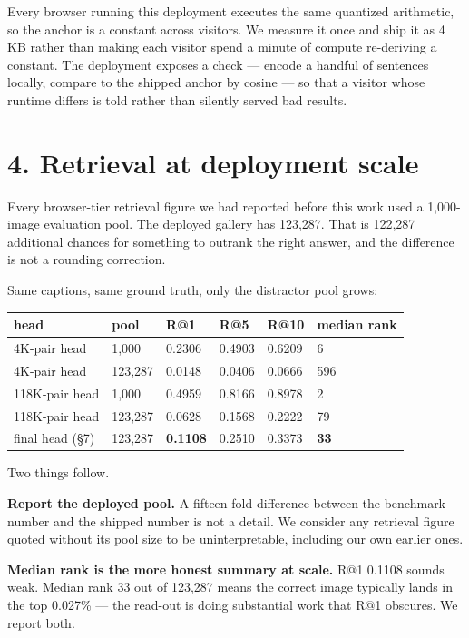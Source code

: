 \documentclass[
  11pt,
]{article}
\newcounter{none} %
\begin{document}
Every browser running this deployment executes the same quantized
arithmetic, so the anchor is a constant across visitors. We measure it
once and ship it as 4 KB rather than making each visitor spend a minute
of compute re-deriving a constant. The deployment exposes a check ---
encode a handful of sentences locally, compare to the shipped anchor by
cosine --- so that a visitor whose runtime differs is told rather than
silently served bad results.

\section{4. Retrieval at deployment
scale}\label{retrieval-at-deployment-scale}

Every browser-tier retrieval figure we had reported before this work
used a 1,000-image evaluation pool. The deployed gallery has 123,287.
That is 122,287 additional chances for something to outrank the right
answer, and the difference is not a rounding correction.

Same captions, same ground truth, only the distractor pool grows:

{\def\LTcaptype{none} %
\begin{longtable}[]{@{}llllll@{}}
\toprule\noalign{}
head & pool & R@1 & R@5 & R@10 & median rank \\
\midrule\noalign{}
\endhead
\bottomrule\noalign{}
\endlastfoot
4K-pair head & 1,000 & 0.2306 & 0.4903 & 0.6209 & 6 \\
4K-pair head & 123,287 & 0.0148 & 0.0406 & 0.0666 & 596 \\
118K-pair head & 1,000 & 0.4959 & 0.8166 & 0.8978 & 2 \\
118K-pair head & 123,287 & 0.0628 & 0.1568 & 0.2222 & 79 \\
final head (§7) & 123,287 & \textbf{0.1108} & 0.2510 & 0.3373 &
\textbf{33} \\
\end{longtable}
}

Two things follow.

\textbf{Report the deployed pool.} A fifteen-fold difference between the
benchmark number and the shipped number is not a detail. We consider any
retrieval figure quoted without its pool size to be uninterpretable,
including our own earlier ones.

\textbf{Median rank is the more honest summary at scale.} R@1 0.1108
sounds weak. Median rank 33 out of 123,287 means the correct image
typically lands in the top 0.027\% --- the read-out is doing substantial
work that R@1 obscures. We report both.
\end{document}
